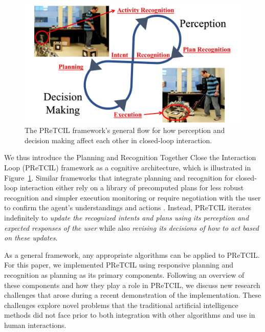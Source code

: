 \documentclass[letterpaper]{article} %
\begin{document}
\begin{figure}
\centering
\includegraphics[scale=0.3]{figures/pretcilFramework.pdf}
\caption{The {\sc PReTCIL} framework's general flow for how perception and decision making affect each other in closed-loop interaction.\label{fig:pretcil}}
\end{figure}

We thus introduce the Planning and Recognition Together Close the Interaction Loop ({\sc PReTCIL}) framework as a cognitive architecture, which is illustrated in Figure~\ref{fig:pretcil}.  Similar frameworks that integrate planning and recognition for closed-loop interaction either rely on a library of precomputed plans for less robust recognition and simpler execution monitoring \cite{levine_ICAPS147945,jair_levineWilliams}
or require negotiation with the user to confirm the agent's understandings and actions \cite{geibPetrick_2016}.  Instead, {\sc PReTCIL} iterates indefinitely to \textit{update the recognized intents and plans using its perception and expected responses of the user} while also \textit{revising its decisions of how to act based on these updates}.

As a general framework, any appropriate algorithms can be applied to {\sc PReTCIL}.  For this paper, we implemented {\sc PReTCIL} using responsive planning \cite{fz_aaai2017} and recognition as planning \cite{DBLP:conf/aaai/RamirezG10} as its primary components.  Following an overview of these components and how they play a role in {\sc PReTCIL}, we discuss new research challenges that arose during a recent demonstration of the implementation.  These challenges explore novel problems that the traditional artificial intelligence methods did not face prior to both integration with other algorithms and use in human interactions.
\end{document}
